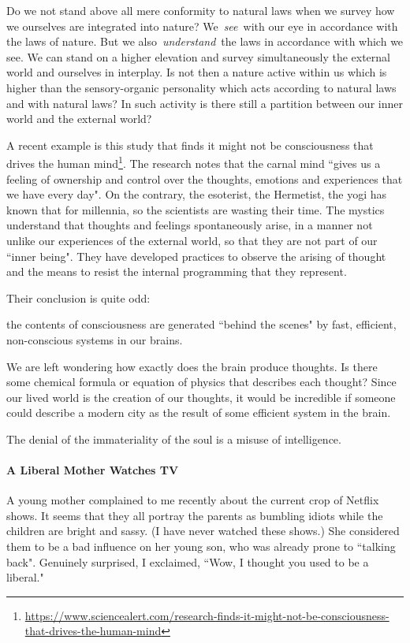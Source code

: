 \begin{quotex}
Do we not stand above all mere conformity to natural laws when we survey how we ourselves are integrated into nature? We \emph{see} with our eye in accordance with the laws of nature. But we also \emph{understand} the laws in accordance with which we see. We can stand on a higher elevation and survey simultaneously the external world and ourselves in interplay. Is not then a nature active within us which is higher than the sensory-organic personality which acts according to natural laws and with natural laws? In such activity is there still a partition between our inner world and the external world? 

\end{quotex}
A recent example is this study that finds it might not be consciousness that drives the human mind\footnote{\url{https://www.sciencealert.com/research-finds-it-might-not-be-consciousness-that-drives-the-human-mind}}. The research notes that the carnal mind ``gives us a feeling of ownership and control over the thoughts, emotions and experiences that we have every day". On the contrary, the esoterist, the Hermetist, the yogi has known that for millennia, so the scientists are wasting their time. The mystics understand that thoughts and feelings spontaneously arise, in a manner not unlike our experiences of the external world, so that they are not part of our ``inner being". They have developed practices to observe the arising of thought and the means to resist the internal programming that they represent.

Their conclusion is quite odd:

\begin{quotex}
the contents of consciousness are generated ``behind the scenes" by fast, efficient, non-conscious systems in our brains. 

\end{quotex}
We are left wondering how exactly does the brain produce thoughts. Is there some chemical formula or equation of physics that describes each thought? Since our lived world is the creation of our thoughts, it would be incredible if someone could describe a modern city as the result of some efficient system in the brain.

The denial of the immateriality of the soul is a misuse of intelligence.

\paragraph{A Liberal Mother Watches TV}
A young mother complained to me recently about the current crop of Netflix shows. It seems that they all portray the parents as bumbling idiots while the children are bright and sassy. (I have never watched these shows.) She considered them to be a bad influence on her young son, who was already prone to ``talking back". Genuinely surprised, I exclaimed, ``Wow, I thought you used to be a liberal."

